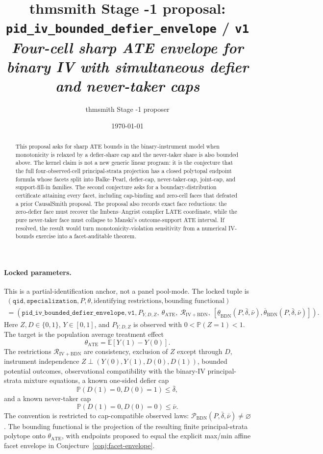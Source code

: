 \documentclass[11pt]{article}
\title{thmsmith Stage -1 proposal: \texttt{pid\_iv\_bounded\_defier\_envelope} / \texttt{v1}%
  \\ \large\textit{Four-cell sharp ATE envelope for binary IV with simultaneous defier and never-taker caps}}
\author{thmsmith Stage -1 proposer}
\date{\today}
\newcommand{\E}{\mathbb{E}}
\renewcommand{\Pr}{\mathbb{P}}
\newcommand{\calR}{\mathcal{R}}
\theoremstyle{definition}
\theoremstyle{plain}
\theoremstyle{remark}
\begin{document}
\maketitle


\paragraph{Locked parameters.}
This is a partial-identification anchor, not a panel pool-mode.  The locked tuple is
\[
\begin{gathered}
(\texttt{qid},\texttt{specialization},P,\theta,\text{identifying restrictions},
  \text{bounding functional})\\
=
(\texttt{pid\_iv\_bounded\_defier\_envelope},\texttt{v1},
  P_{Y,D,Z},\ \theta_{\mathrm{ATE}},\
  \calR_{\mathrm{IV+BDN}},\
  [\underline\theta_{\mathrm{BDN}}(P,\bar\delta,\bar\nu),
    \overline\theta_{\mathrm{BDN}}(P,\bar\delta,\bar\nu)]) .
\end{gathered}
\]
Here \(Z,D\in\{0,1\}\), \(Y\in[0,1]\), and \(P_{Y,D,Z}\) is observed with
\(0<\Pr(Z=1)<1\).  The target is the population average treatment effect
\[
\theta_{\mathrm{ATE}}=\E[Y(1)-Y(0)].
\]
The restrictions \(\calR_{\mathrm{IV+BDN}}\) are consistency, exclusion of \(Z\)
except through \(D\), instrument independence
\(Z\perp (Y(0),Y(1),D(0),D(1))\), bounded potential outcomes, observational
compatibility with the binary-IV principal-strata mixture equations, a known
one-sided defier cap
\[
\Pr(D(1)=0,D(0)=1)\le \bar\delta,
\]
and a known never-taker cap
\[
\Pr(D(1)=0,D(0)=0)\le \bar\nu.
\]
The convention is restricted to cap-compatible observed laws:
\(\mathcal{P}_{\mathrm{BDN}}(P,\bar\delta,\bar\nu)\ne\varnothing\).
The bounding functional is the projection of the resulting finite
principal-strata polytope onto \(\theta_{\mathrm{ATE}}\), with endpoints proposed
to equal the explicit max/min affine facet envelope in
Conjecture~\ref{conj:facet-envelope}.

\begin{abstract}
This proposal asks for sharp ATE bounds in the binary-instrument model when
monotonicity is relaxed by a defier-share cap and the never-taker share is also
bounded above.  The kernel claim is not a new generic linear program: it is the
conjecture that the full four-observed-cell principal-strata projection has a
closed polytopal endpoint formula whose facets split into Balke--Pearl,
defier-cap, never-taker-cap, joint-cap, and support-fill-in families.  The
second conjecture asks for a boundary-distribution certificate attaining every
facet, including cap-binding and zero-cell faces that defeated a prior
CausalSmith proposal.  The proposal also records exact face reductions: the
zero-defier face must recover the Imbens--Angrist complier LATE coordinate,
while the pure never-taker face must collapse to Manski's outcome-support ATE
interval.  If resolved, the result would turn monotonicity-violation sensitivity
from a numerical IV-bounds exercise into a facet-auditable theorem.
\end{abstract}
\end{document}
